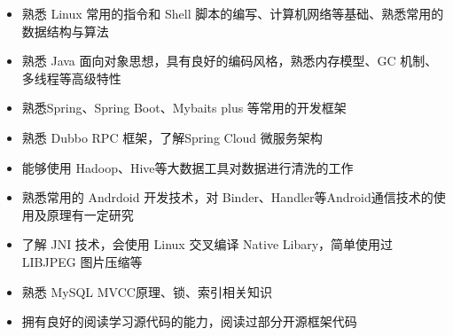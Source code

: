   \begin{itemize}[leftmargin=*]
  \item 熟悉 Linux 常用的指令和 Shell 脚本的编写、计算机网络等基础、熟悉常用的数据结构与算法
  \item 熟悉 Java 面向对象思想，具有良好的编码风格，熟悉内存模型、GC 机制、多线程等高级特性
  \item 熟悉Spring、Spring Boot、Mybaits plus 等常用的开发框架
  \item 熟悉 Dubbo RPC 框架，了解Spring Cloud 微服务架构
  \item 能够使用 Hadoop、Hive等大数据工具对数据进行清洗的工作
  \item 熟悉常用的 Andrdoid 开发技术，对 Binder、Handler等Android通信技术的使用及原理有一定研究
  \item 了解 JNI 技术，会使用 Linux 交叉编译 Native Libary，简单使用过 LIBJPEG 图片压缩等
  \item 熟悉 MySQL MVCC原理、锁、索引相关知识
  \item 拥有良好的阅读学习源代码的能力，阅读过部分开源框架代码 
  \end{itemize}